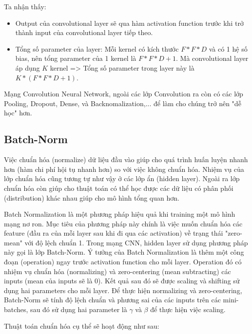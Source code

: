 Ta nhận thấy:
\begin{itemize}
\item Output của convolutional layer sẽ qua hàm activation function trước khi trở thành input của convolutional layer tiếp theo.
\item Tổng số parameter của layer: Mỗi kernel có kích thước $F*F*D$ và có 1 hệ số bias, nên tổng parameter của 1 kernel là $F*F*D + 1$. Mà convolutional layer áp dụng $K$ kernel => Tổng số parameter trong layer này là $K * (F*F*D + 1)$.
\end{itemize}
Mạng Convolution Neural Network, ngoài các lớp Convolution ra còn có các lớp Pooling, Dropout, Dense, và Backnomalization,... để làm cho chúng trở nên "dễ học" hơn.

\subsection{Batch-Norm}
Việc chuẩn hóa (normalize) dữ liệu đầu vào giúp cho quá trình huấn luyện nhanh hơn (hàm chi phí hội tụ nhanh hơn) so với việc không chuẩn hóa. Nhiệm vụ của lớp chuẩn hóa cũng tương tự như vậy ở các lớp ẩn (hidden layer). Ngoài ra lớp chuẩn hóa còn giúp cho thuật toán có thể học được các dữ liệu có phân phối (distribution) khác nhau giúp cho mô hình tổng quan hơn.

Batch Normalization là một phương pháp hiệu quả khi training một mô hình mạng nơ ron. Mục tiêu của phương pháp này chính là việc muốn chuẩn hóa các feature (đầu ra của mỗi layer sau khi đi qua các activation) về trạng thái "zero-mean" với độ lệch chuẩn 1. Trong mạng CNN, hidden layer sử dụng phương pháp này gọi là lớp Batch-Norm. Ý tưởng của Batch Normalization là thêm một công đoạn (operation) ngay trước activation function cho mỗi layer. Operation đó có nhiệm vụ chuẩn hóa (normalizing) và zero-centering (mean subtracting) các inputs (mean của inputs sẽ là 0). Kết quả sau đó sẽ được scaling và shifting sử dụng hai parameters cho mỗi layer. Để thực hiện normalizing và zero-centering, Batch-Norm sẽ tính độ lệch chuẩn và phương sai của các inputs trên các mini-batches, sau đó sử dụng hai parameter là $\gamma$ và $ \beta$  để thực hiện việc scaling.

Thuật toán chuẩn hóa cụ thể sẽ hoạt động như sau:

